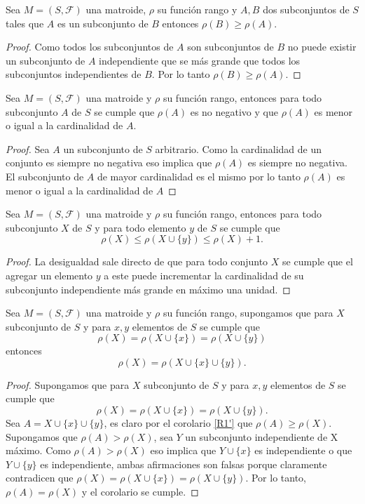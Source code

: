 \begin{cor}\label{R2'}
Sea $M=(S,\mathcal{F})$ una matroide, $\rho$ su función rango y $A,B$ dos subconjuntos de $S$ tales que $A$ es un subconjunto de $B$ entonces $\rho(B) \geq \rho(A)$.
\end{cor}
\begin{proof}
Como todos los subconjuntos de $A$ son subconjuntos de $B$ no puede existir un subconjunto de $A$ independiente que se más grande que todos los subconjuntos independientes de $B$. Por lo tanto $\rho(B) \geq \rho(A)$.
\end{proof}

\begin{cor} \label{R1'}
Sea $M=(S,\mathcal{F})$ una matroide y $\rho$ su función rango, entonces para todo subconjunto $A$ de $S$ se cumple que $\rho (A)$ es no negativo y que $\rho(A)$ es menor o igual a la cardinalidad de $A$.
\end{cor}

\begin{proof}
Sea $A$ un subconjunto de $S$ arbitrario. 
Como la cardinalidad de un conjunto es siempre no negativa eso implica que $\rho(A)$ es siempre no negativa. El subconjunto de $A$ de mayor cardinalidad es el mismo por lo tanto $\rho(A)$ es menor o igual a la cardinalidad de $A$
\end{proof}

\begin{cor} \label{R2}
Sea $M=(S,\mathcal{F})$ una matroide y $\rho$ su función rango, entonces para todo subconjunto $X$ de $S$ y para todo elemento $y$ de $S$ se cumple que
$$\rho(X) \leq \rho(X \cup \{y\}) \leq \rho(X)+1.$$
\end{cor} 

\begin{proof}
La desigualdad sale directo de que para todo conjunto $X$ se cumple que el agregar un elemento $y$ a este puede incrementar la cardinalidad de su subconjunto independiente más grande en máximo una unidad.
\end{proof}

\begin{cor} \label{R3}
Sea $M=(S,\mathcal{F})$ una matroide y $\rho$ su función rango, supongamos que para $X$ subconjunto de $S$ y para $x,y$ elementos de $S$ se cumple que 
$$\rho(X)=\rho(X \cup \{ x\}) =\rho(X \cup \{ y\}) $$ 
entonces 
$$\rho(X)=\rho(X \cup \{ x\} \cup \{ y\}).$$
\end{cor}

\begin{proof}
Supongamos que para $X$ subconjunto de $S$ y para $x,y$ elementos de $S$ se cumple que 
$$\rho(X)=\rho(X \cup \{ x\}) =\rho(X \cup \{ y\}). $$ 
Sea $A = X \cup \{ x\} \cup \{ y\}$, es claro por el corolario \ref{R1'} que $\rho(A) \geq \rho(X)$. Supongamos que $\rho(A) > \rho(X)$, sea $Y$ un subconjunto independiente de X máximo. Como $\rho(A) > \rho(X)$ eso implica que $Y \cup \{x\}$ es independiente o que $Y \cup \{y\}$ es independiente, ambas afirmaciones son falsas porque claramente contradicen que $\rho(X)=\rho(X \cup \{ x\}) =\rho(X \cup \{ y\})$. Por lo tanto, $\rho(A) = \rho(X)$ y el corolario se cumple. 
\end{proof}

